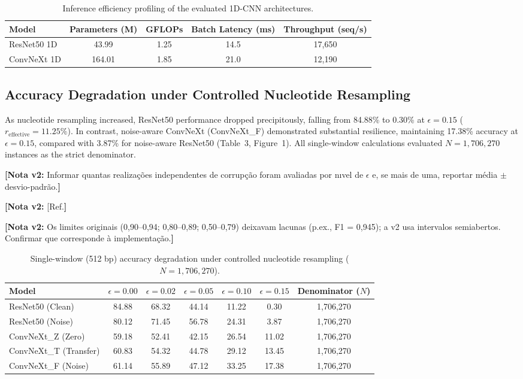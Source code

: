 \documentclass[11pt,a4paper]{article}
\newcommand{\notavdois}[1]{\par\vspace{0.4em}\noindent\colorbox{yellow!25}{\begin{minipage}{0.96\linewidth}\footnotesize\textbf{[Nota v2:} #1\textbf{]}\end{minipage}}\par\vspace{0.4em}}
\begin{document}
{\begin{table}[h!]
\centering
\small
\caption{Inference efficiency profiling of the evaluated 1D-CNN architectures.}
\begin{tabular}{lcccc}
\toprule
\textbf{Model} & \textbf{Parameters (M)} & \textbf{GFLOPs} & \textbf{Batch Latency (ms)} & \textbf{Throughput (seq/s)} \\
\midrule
ResNet50 1D & 43.99 & 1.25 & 14.5 & 17,650 \\
ConvNeXt 1D & 164.01 & 1.85 & 21.0 & 12,190 \\
\bottomrule
\end{tabular}
\end{table}

\subsection{Accuracy Degradation under Controlled Nucleotide Resampling}
As nucleotide resampling increased, ResNet50 performance dropped precipitously, falling from 84.88\% to 0.30\% at $\epsilon=0.15$ ($r_{\text{effective}} = 11.25\%$). In contrast, noise-aware ConvNeXt (ConvNeXt\_F) demonstrated substantial resilience, maintaining 17.38\% accuracy at $\epsilon=0.15$, compared with 3.87\% for noise-aware ResNet50 (Table~3, Figure~1). All single-window calculations evaluated $N=1,706,270$ instances as the strict denominator.

\notavdois{Informar quantas realizações independentes de corrupção foram avaliadas por nıvel de $\epsilon$ e, se mais de uma, reportar média $\pm$ desvio-padrão.}


\notavdois{[Ref.}


\notavdois{Os limites originais (0,90–0,94; 0,80–0,89; 0,50–0,79) deixavam lacunas (p.ex., F1 = 0,945); a v2 usa intervalos semiabertos. Confirmar que corresponde à implementação.}


\begin{table}[h!]
\centering
\small
\caption{Single-window (512 bp) accuracy degradation under controlled nucleotide resampling ($N=1,706,270$).}
\begin{tabular}{lcccccc}
\toprule
\textbf{Model} & \textbf{$\epsilon=0.00$} & \textbf{$\epsilon=0.02$} & \textbf{$\epsilon=0.05$} & \textbf{$\epsilon=0.10$} & \textbf{$\epsilon=0.15$} & \textbf{Denominator ($N$)} \\
\midrule
ResNet50 (Clean) & 84.88 & 68.32 & 44.14 & 11.22 & 0.30 & 1,706,270 \\
ResNet50 (Noise) & 80.12 & 71.45 & 56.78 & 24.31 & 3.87 & 1,706,270 \\
ConvNeXt\_Z (Zero) & 59.18 & 52.41 & 42.15 & 26.54 & 11.02 & 1,706,270 \\
ConvNeXt\_T (Transfer) & 60.83 & 54.32 & 44.78 & 29.12 & 13.45 & 1,706,270 \\
ConvNeXt\_F (Noise) & 61.14 & 55.89 & 47.12 & 33.25 & 17.38 & 1,706,270 \\
\bottomrule
\end{tabular}
\end{table}

}
\end{document}
